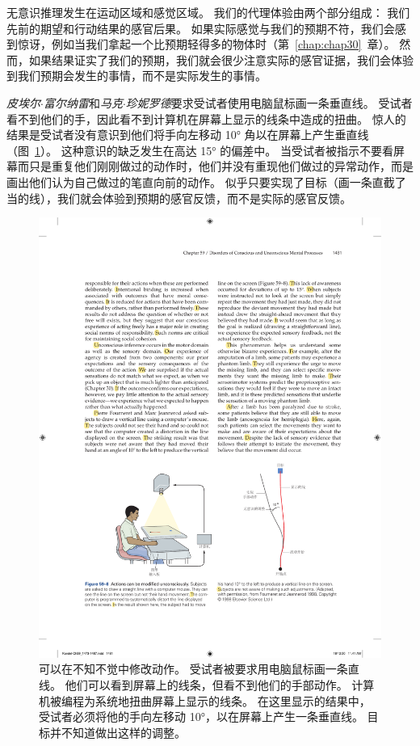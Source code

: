 无意识推理发生在运动区域和感觉区域。
我们的代理体验由两个部分组成：
我们先前的期望和行动结果的感官后果。
如果实际感觉与我们的预期不符，我们会感到惊讶，例如当我们拿起一个比预期轻得多的物体时（第~\ref{chap:chap30}~章）。
然而，如果结果证实了我们的预期，我们就会很少注意实际的感官证据，我们会体验到我们预期会发生的事情，而不是实际发生的事情。


\textit{皮埃尔$\cdot$富尔纳雷}和\textit{马克$\cdot$珍妮罗德}要求受试者使用电脑鼠标画一条垂直线。
受试者看不到他们的手，因此看不到计算机在屏幕上显示的线条中造成的扭曲。
惊人的结果是受试者没有意识到他们将手向左移动 10° 角以在屏幕上产生垂直线（图~\ref{fig:59_8}）。
这种意识的缺乏发生在高达 15° 的偏差中。
当受试者被指示不要看屏幕而只是重复他们刚刚做过的动作时，他们并没有重现他们做过的异常动作，而是画出他们认为自己做过的笔直向前的动作。
似乎只要实现了目标（画一条直截了当的线），我们就会体验到预期的感官反馈，而不是实际的感官反馈。


\begin{figure}[htbp]
	\centering
	\includegraphics[width=0.9\linewidth]{chap59/fig_59_8}
	\caption{可以在不知不觉中修改动作。
		受试者被要求用电脑鼠标画一条直线。
		他们可以看到屏幕上的线条，但看不到他们的手部动作。
		计算机被编程为系统地扭曲屏幕上显示的线条。
		在这里显示的结果中，受试者必须将他的手向左移动 10°，以在屏幕上产生一条垂直线。
		目标并不知道做出这样的调整\cite{fourneret1998limited}。}
	\label{fig:59_8}
\end{figure}


